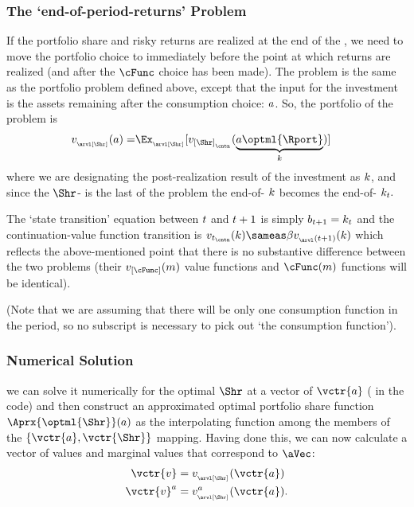 \subsubsection{The `end-of-period-returns' Problem}

If the portfolio share and risky returns are realized at the end of the {\interval}, we need to move the portfolio choice {\stg} to immediately before the point at which returns are realized (and after the $\cFunc$ choice has been made).  The problem is the same as the portfolio problem defined above, except that the input for the investment {\stg} is the assets remaining after the consumption choice: $a$.  So, the portfolio {\stg} of the problem is
\begin{equation}\begin{gathered}\begin{aligned}
  \vFunc_{_\arvl[\Shr]}(\aNrm) = & \Ex_{_\arvl[\Shr]}[\vFunc_{[\Shr]_{_\cntn}}(\underbrace{\aNrm\optml{\Rport}}_{\kNrm})] %
    \end{aligned}\end{gathered}\end{equation}
where we are designating the post-realization result of the investment as $k$, and since the $\Shr$-{\stg} is the last {\stg} of the problem the end-of-{\stg} $k$ becomes the end-of-{\interval} $k_{t}.$ 

The `state transition' equation between $t$ and $t+1$ is simply $b_{t+1} = k_{t}$ and the continuation-value function transition is $\vFunc_{\prd_\cntn}(\kNrm) \sameas \DiscFac \vFunc_{_\arvl(\prd+1)}(\kNrm)$ which reflects the above-mentioned point that there is no substantive difference between the two problems (their $\vFunc_{[\cFunc]}(\mNrm)$ value functions and $\cFunc(\mNrm)$ functions will be identical).

(Note that we are assuming that there will be only one consumption function in the period, so no {\stg} subscript is necessary to pick out `the consumption function'). 

\subsubsection{Numerical Solution}
we can solve it numerically for the optimal $\Shr$ at a vector of $\vctr{a}$ ({\aVecCode} in the code)  and then construct an approximated optimal portfolio share function $\Aprx{\optml{\Shr}}(a)$ as the interpolating function among the members of the $\{\vctr{a},\vctr{\Shr}\}$ mapping.  Having done this, we can now calculate a vector of values and marginal values that correspond to $\aVec$:
\begin{equation}\begin{gathered}\begin{aligned}
      \vctr{v}  & = \vFunc_{_\arvl[\Shr]}(\vctr{a}) \label{eq:vShrEnd}
\\      \vctr{v}^\aNrm  & = \vFunc^{\aNrm}_{_\arvl[\Shr]}(\vctr{a}).
    \end{aligned}\end{gathered}\end{equation}

